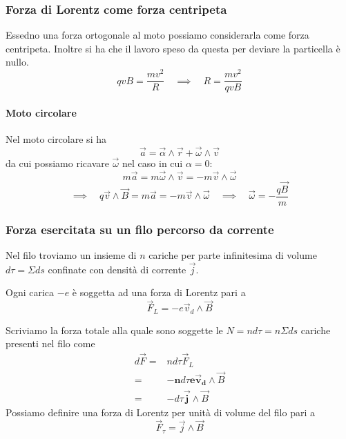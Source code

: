\documentclass[x11names]{report}
\begin{document}
\subsubsection{Forza di Lorentz come forza centripeta}
Essedno una forza ortogonale al moto possiamo considerarla come forza centripeta. Inoltre si ha che il lavoro speso da questa per deviare la particella è nullo.
\[
qvB = \frac{mv^2}{R} \quad \implies \quad R = \frac{mv^2}{qvB} 
\]
\paragraph{Moto circolare}
Nel moto circolare si ha
\[
\vec{a} = \vec{\alpha}\wedge\vec{r} + \vec{\omega}\wedge\vec{v}
\]
da cui possiamo ricavare \(\vec{\omega}\) nel caso in cui \(\alpha = 0\):
\[
m\vec{a} = m\vec{\omega}\wedge\vec{v} = - m\vec{v}\wedge\vec{\omega}
\]
\[
\implies \quad q\vec{v} \wedge \vec{B} = m\vec{a} = - m\vec{v}\wedge\vec{\omega} \quad \implies \quad \vec{\omega} = -\frac{q\vec{B}}{m}
\]

\subsubsection{Forza esercitata su un filo percorso da corrente}
Nel filo troviamo un insieme  di \(n\) cariche per parte infinitesima di volume \(d\tau = \Sigma ds\) confinate con densità di corrente \(\vec{j}\).

Ogni carica \(-e\) è soggetta ad una forza di Lorentz pari a 
\[
\vec{F}_L = -e\vec{v}_d \wedge \vec{B}
\] 
\begin{figure}[H]
	\centering
\end{figure}
Scriviamo la forza totale alla quale sono soggette le \(N = nd\tau = n\Sigma ds\) cariche presenti nel filo come
\begin{align*}
	d\vec{F} =& n d\tau \vec{F}_L  \\
			 =& -\boldsymbol{n} d\tau \boldsymbol{e\vec{v}_d} \wedge \vec{B}  \\
			 =&  -d\tau \boldsymbol{\vec{j}}\wedge \vec{B}
\end{align*}
Possiamo definire una forza di Lorentz per unità di volume del filo pari a 
\[
\vec{F}_\tau = \vec{j}\wedge \vec{B}
\]
\end{document}
